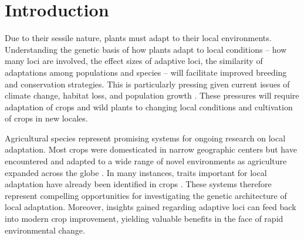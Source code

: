 
\begin{center}
\end{center}
%
%

\section*{Introduction}

Due to their sessile nature, plants must adapt to their local environments. Understanding the genetic basis of how plants adapt to local conditions -- how many loci are involved, the effect sizes of adaptive loci, the similarity of adaptations among populations and species -- will facilitate improved breeding and conservation strategies.  This is particularly pressing given current issues of climate change, habitat loss, and population growth \citep{savolainen2013ecological}.  These pressures will require adaptation of crops and wild plants to changing local conditions and cultivation of crops in new locales.   

Agricultural species represent promising systems for ongoing research on local adaptation.  Most crops were domesticated in narrow geographic centers but have encountered and adapted to a wide range of novel environments as agriculture expanded across the globe \citep{Gepts201451}.  In many instances, traits important for  local adaptation have already been identified in crops \citep{Gepts201451, purugganan2009nature}.  These systems therefore represent compelling opportunities for investigating the genetic architecture of local adaptation.  Moreover, insights gained regarding adaptive loci can feed back into modern crop improvement, yielding valuable benefits in the face of rapid environmental change.

